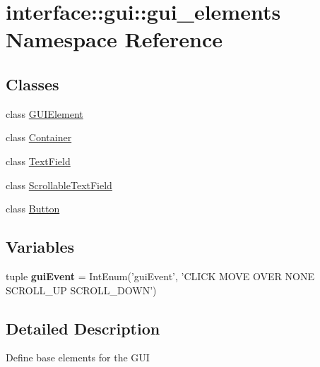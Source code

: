 \hypertarget{namespaceinterface_1_1gui_1_1gui__elements}{\section{interface\-:\-:gui\-:\-:gui\-\_\-elements \-Namespace \-Reference}
\label{namespaceinterface_1_1gui_1_1gui__elements}
}
\subsection*{\-Classes}
\begin{DoxyCompactItemize}
\item 
class \hyperlink{classinterface_1_1gui_1_1gui__elements_1_1_g_u_i_element}{\-G\-U\-I\-Element}
\item 
class \hyperlink{classinterface_1_1gui_1_1gui__elements_1_1_container}{\-Container}
\item 
class \hyperlink{classinterface_1_1gui_1_1gui__elements_1_1_text_field}{\-Text\-Field}
\item 
class \hyperlink{classinterface_1_1gui_1_1gui__elements_1_1_scrollable_text_field}{\-Scrollable\-Text\-Field}
\item 
class \hyperlink{classinterface_1_1gui_1_1gui__elements_1_1_button}{\-Button}
\end{DoxyCompactItemize}
\subsection*{\-Variables}
\begin{DoxyCompactItemize}
\item 
\hypertarget{namespaceinterface_1_1gui_1_1gui__elements_a3842789d736ada7260e64a58fedd4b46}{tuple {\bfseries gui\-Event} = \-Int\-Enum('gui\-Event', '\-C\-L\-I\-C\-K \-M\-O\-V\-E \-O\-V\-E\-R \-N\-O\-N\-E \-S\-C\-R\-O\-L\-L\-\_\-\-U\-P \-S\-C\-R\-O\-L\-L\-\_\-\-D\-O\-W\-N')}\label{namespaceinterface_1_1gui_1_1gui__elements_a3842789d736ada7260e64a58fedd4b46}

\end{DoxyCompactItemize}


\subsection{\-Detailed \-Description}
\begin{DoxyVerb}Define base elements for the GUI \end{DoxyVerb}
 